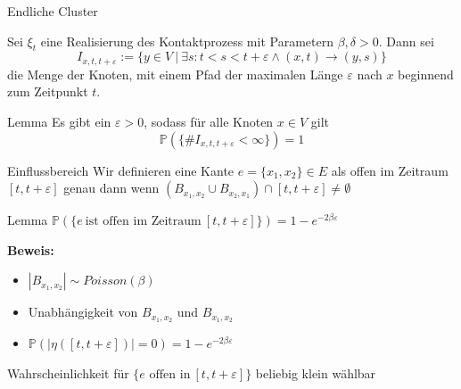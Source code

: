 \documentclass[11pt]{beamer}
\begin{document}
\begin{frame}{Endliche Cluster}
    
    Sei $\xi_t$ eine Realisierung des Kontaktprozess mit Parametern $\beta, \delta > 0$.
    Dann sei 
    \begin{equation*}
        I_{x, t, t + \varepsilon} := \{y \in V\ |\ \exists s : t < s < t + \varepsilon \wedge (x,t) \to (y,s) \} 
        \end{equation*}
    die Menge der Knoten, mit einem Pfad der maximalen Länge
    $\varepsilon$ nach $x$ beginnend zum Zeitpunkt $t$. 
    \begin{block}{Lemma}
        Es gibt ein $\varepsilon > 0$, sodass für alle Knoten $x \in V$ gilt
        \begin{equation*}
            \mathbb{P}(\{ \#I_{x, t, t + \varepsilon} < \infty \}) = 1
        \end{equation*}
    \end{block}
\end{frame}

\begin{frame}{Einflussbereich}
    Wir definieren eine Kante $e = \{x_1, x_2\} \in E$ als offen im Zeitraum $[t, t + \varepsilon]$
    genau dann wenn $(B_{x_1, x_2} \cup B_{x_2, x_1}) \cap [t, t + \varepsilon] \not= \emptyset$
    
    \begin{block}{Lemma}
        $\mathbb{P}(\{ e\ \text{ist offen im Zeitraum}\ [t, t + \varepsilon] \}) = 1 - e^{-2\beta\varepsilon}$
    \end{block}
    \textbf{Beweis:}
    \begin{itemize}
        \item $|B_{x_1,x_2}| \sim Poisson(\beta)$
        \item Unabhängigkeit von $B_{x_1,x_2}$ und $B_{x_1,x_2}$
        \item $\mathbb{P}(|\eta([t, t + \varepsilon])| = 0) =  1 - e^{-2\beta\varepsilon}$
    \end{itemize}
    Wahrscheinlichkeit für $\{ e \text{ offen in}\ [t, t + \varepsilon] \} $ beliebig klein wählbar
\end{frame}
\end{document}
